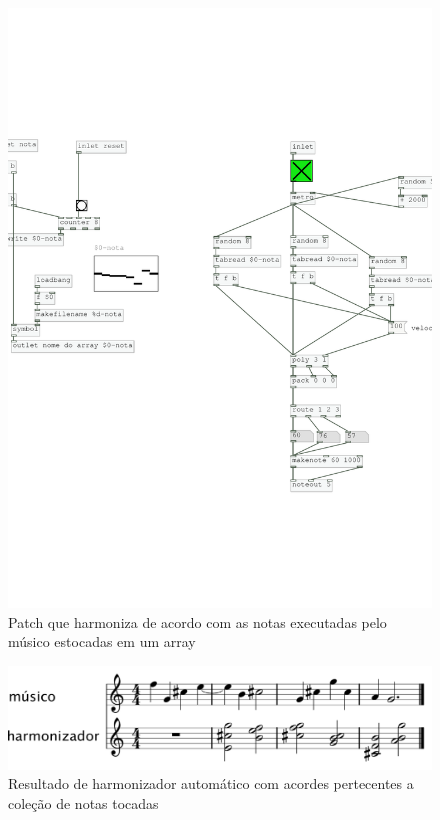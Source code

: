 \documentclass{ppgmus}
\begin{document}
\begin{figure}
\includegraphics[scale=.6]{harm6}
\caption{Patch que harmoniza de acordo com as notas executadas pelo músico estocadas em um array}
\label{harm6}
\end{figure}

\begin{figure}
\includegraphics[scale=.6]{harm-colecao}
\caption{Resultado de harmonizador automático com acordes pertecentes a coleção de notas tocadas}
\label{harm-colecao}
\end{figure}
\end{document}
